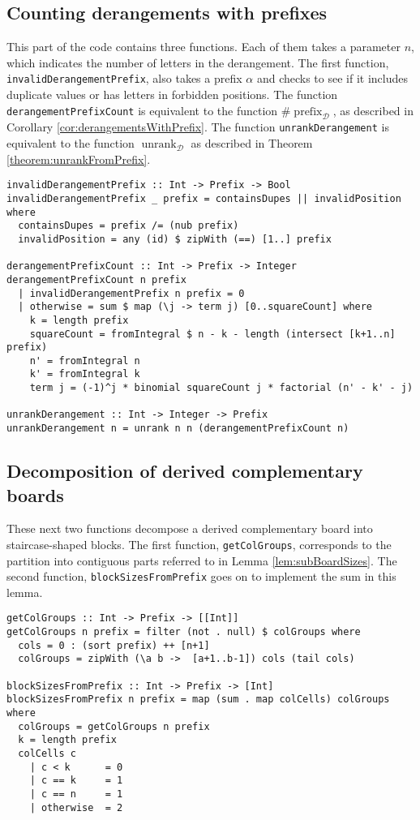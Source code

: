 \subsection{Counting derangements with prefixes}
This part of the code contains three functions. Each of them takes a parameter
$n$, which indicates the number of letters in the derangement.
The first function, \texttt{invalidDerangementPrefix}, also takes a prefix
$\alpha$ and checks to see if it includes duplicate values or has
letters in forbidden positions.
The function \texttt{derangementPrefixCount}
is equivalent to the function $\#\operatorname{prefix}_\mathcal{D}$,
as described in Corollary \ref{cor:derangementsWithPrefix}.
The function \texttt{unrankDerangement} is equivalent to the function
$\operatorname{unrank}_\mathcal{D}$ as described in
Theorem \ref{theorem:unrankFromPrefix}.
\begin{singlespace}\begin{verbatim}
invalidDerangementPrefix :: Int -> Prefix -> Bool
invalidDerangementPrefix _ prefix = containsDupes || invalidPosition where
  containsDupes = prefix /= (nub prefix)
  invalidPosition = any (id) $ zipWith (==) [1..] prefix

derangementPrefixCount :: Int -> Prefix -> Integer
derangementPrefixCount n prefix
  | invalidDerangementPrefix n prefix = 0
  | otherwise = sum $ map (\j -> term j) [0..squareCount] where
    k = length prefix
    squareCount = fromIntegral $ n - k - length (intersect [k+1..n] prefix)
    n' = fromIntegral n
    k' = fromIntegral k
    term j = (-1)^j * binomial squareCount j * factorial (n' - k' - j)

unrankDerangement :: Int -> Integer -> Prefix
unrankDerangement n = unrank n n (derangementPrefixCount n)
\end{verbatim}\end{singlespace}

\subsection{Decomposition of derived complementary boards}
These next two functions decompose a derived complementary board into
staircase-shaped blocks.
The first function, \texttt{getColGroups}, corresponds to the partition
into contiguous parts referred to in Lemma \ref{lem:subBoardSizes}.
The second function, \texttt{blockSizesFromPrefix} goes on to implement the
sum in this lemma.
\begin{singlespace}\begin{verbatim}
getColGroups :: Int -> Prefix -> [[Int]]
getColGroups n prefix = filter (not . null) $ colGroups where
  cols = 0 : (sort prefix) ++ [n+1]
  colGroups = zipWith (\a b ->  [a+1..b-1]) cols (tail cols)

blockSizesFromPrefix :: Int -> Prefix -> [Int]
blockSizesFromPrefix n prefix = map (sum . map colCells) colGroups where
  colGroups = getColGroups n prefix
  k = length prefix
  colCells c
    | c < k      = 0
    | c == k     = 1
    | c == n     = 1
    | otherwise  = 2
\end{verbatim}\end{singlespace}

